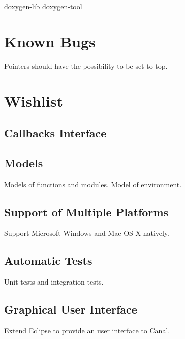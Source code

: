 \documentclass[a4paper]{book}
\begin{document}
{doxygen-lib}
{doxygen-tool}

\chapter{Known Bugs}
Pointers should have the possibility to be set to top.

\chapter{Wishlist}

\section{Callbacks Interface}

\section{Models}
Models of functions and modules.  Model of environment.

\section{Support of Multiple Platforms}
Support Microsoft Windows and Mac OS X natively.

\section{Automatic Tests}
Unit tests and integration tests.

\section{Graphical User Interface}
Extend Eclipse to provide an user interface to Canal.
\end{document}
